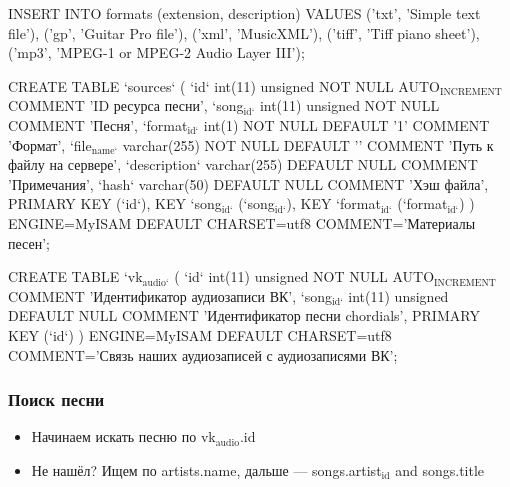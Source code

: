 \documentclass[11pt]{article}
\begin{document}
INSERT INTO
  formats (extension, description)
VALUES
  ('txt', 'Simple text file'),
  ('gp', 'Guitar Pro file'),
  ('xml', 'MusicXML'),
  ('tiff', 'Tiff piano sheet'),
  ('mp3', 'MPEG-1 or MPEG-2 Audio Layer III');

CREATE TABLE `sources` (
  `id` int(11) unsigned NOT NULL AUTO$_{\text{INCREMENT}}$ COMMENT 'ID ресурса песни',
  `song$_{\text{id`}}$ int(11) unsigned NOT NULL COMMENT 'Песня',
  `format$_{\text{id`}}$ int(1) NOT NULL DEFAULT '1' COMMENT 'Формат',
  `file$_{\text{name`}}$ varchar(255) NOT NULL DEFAULT '' COMMENT 'Путь к файлу на сервере',
  `description` varchar(255) DEFAULT NULL COMMENT 'Примечания',
  `hash` varchar(50) DEFAULT NULL COMMENT 'Хэш файла',
  PRIMARY KEY (`id`),
  KEY `song$_{\text{id`}}$ (`song$_{\text{id`}}$),
  KEY `format$_{\text{id`}}$ (`format$_{\text{id`}}$)
) ENGINE=MyISAM DEFAULT CHARSET=utf8 COMMENT='Материалы песен';

CREATE TABLE `vk$_{\text{audio`}}$ (
  `id` int(11) unsigned NOT NULL AUTO$_{\text{INCREMENT}}$ COMMENT 'Идентификатор аудиозаписи ВК',
  `song$_{\text{id`}}$ int(11) unsigned DEFAULT NULL COMMENT 'Идентификатор песни chordials',
  PRIMARY KEY (`id`)
) ENGINE=MyISAM DEFAULT CHARSET=utf8 COMMENT='Связь наших аудиозаписей с аудиозаписями ВК';
\subsubsection{Поиск песни}
\label{sec-1-1-2}
\begin{itemize}
\item Начинаем искать песню по vk$_{\text{audio}}$.id
\item Не нашёл? Ищем по artists.name, дальше — songs.artist$_{\text{id}}$ and songs.title
\end{itemize}
\end{document}
